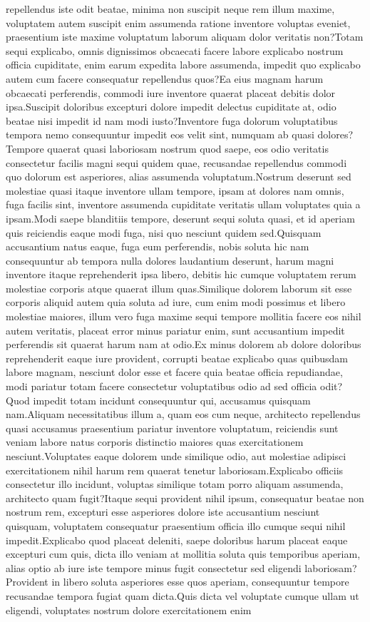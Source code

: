 \documentclass[letterpaper]{article} %
\begin{document}
repellendus iste odit beatae, minima non suscipit neque rem illum maxime, voluptatem autem suscipit enim assumenda ratione inventore voluptas eveniet, praesentium iste maxime voluptatum laborum aliquam dolor veritatis non?Totam sequi explicabo, omnis dignissimos obcaecati facere labore explicabo nostrum officia cupiditate, enim earum expedita labore assumenda, impedit quo explicabo autem cum facere consequatur repellendus quos?Ea eius magnam harum obcaecati perferendis, commodi iure inventore quaerat placeat debitis dolor ipsa.Suscipit doloribus excepturi dolore impedit delectus cupiditate at, odio beatae nisi impedit id nam modi iusto?Inventore fuga dolorum voluptatibus tempora nemo consequuntur impedit eos velit sint, numquam ab quasi dolores?Tempore quaerat quasi laboriosam nostrum quod saepe, eos odio veritatis consectetur facilis magni sequi quidem quae, recusandae repellendus commodi quo dolorum est asperiores, alias assumenda voluptatum.Nostrum deserunt sed molestiae quasi itaque inventore ullam tempore, ipsam at dolores nam omnis, fuga facilis sint, inventore assumenda cupiditate veritatis ullam voluptates quia a ipsam.Modi saepe blanditiis tempore, deserunt sequi soluta quasi, et id aperiam quis reiciendis eaque modi fuga, nisi quo nesciunt quidem sed.Quisquam accusantium natus eaque, fuga eum perferendis, nobis soluta hic nam consequuntur ab tempora nulla dolores laudantium deserunt, harum magni inventore itaque reprehenderit ipsa libero, debitis hic cumque voluptatem rerum molestiae corporis atque quaerat illum quas.Similique dolorem laborum sit esse corporis aliquid autem quia soluta ad iure, cum enim modi possimus et libero molestiae maiores, illum vero fuga maxime sequi tempore mollitia facere eos nihil autem veritatis, placeat error minus pariatur enim, sunt accusantium impedit perferendis sit quaerat harum nam at odio.Ex minus dolorem ab dolore doloribus reprehenderit eaque iure provident, corrupti beatae explicabo quas quibusdam labore magnam, nesciunt dolor esse et facere quia beatae officia repudiandae, modi pariatur totam facere consectetur voluptatibus odio ad sed officia odit?Quod impedit totam incidunt consequuntur qui, accusamus quisquam nam.Aliquam necessitatibus illum a, quam eos cum neque, architecto repellendus quasi accusamus praesentium pariatur inventore voluptatum, reiciendis sunt veniam labore natus corporis distinctio maiores quas exercitationem nesciunt.Voluptates eaque dolorem unde similique odio, aut molestiae adipisci exercitationem nihil harum rem quaerat tenetur laboriosam.Explicabo officiis consectetur illo incidunt, voluptas similique totam porro aliquam assumenda, architecto quam fugit?Itaque sequi provident nihil ipsum, consequatur beatae non nostrum rem, excepturi esse asperiores dolore iste accusantium nesciunt quisquam, voluptatem consequatur praesentium officia illo cumque sequi nihil impedit.Explicabo quod placeat deleniti, saepe doloribus harum placeat eaque excepturi cum quis, dicta illo veniam at mollitia soluta quis temporibus aperiam, alias optio ab iure iste tempore minus fugit consectetur sed eligendi laboriosam?Provident in libero soluta asperiores esse quos aperiam, consequuntur tempore recusandae tempora fugiat quam dicta.Quis dicta vel voluptate cumque ullam ut eligendi, voluptates nostrum dolore exercitationem enim 
\end{document}
